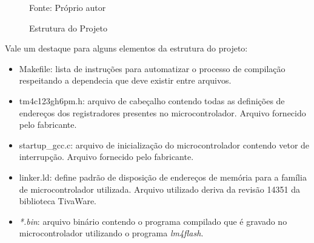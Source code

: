 \begin{figure}[!htb]
\centering
\caption{ Estrutura do Projeto}
\label{fig:estruturaProjeto}

{\small Fonte: Próprio autor}
\end{figure}


Vale um destaque para alguns elementos da estrutura do projeto:


\begin{itemize}
\item Makefile: lista de instruções para automatizar o processo de compilação respeitando a dependecia que deve existir entre arquivos.
\item tm4c123gh6pm.h: arquivo de cabeçalho contendo todas as definições de endereços dos registradores presentes no microcontrolador. Arquivo fornecido pelo fabricante. 
\item startup\_gcc.c: arquivo de inicialização do microcontrolador contendo vetor de interrupção. Arquivo fornecido pelo fabricante.
\item linker.ld: define padrão de disposição de endereços de memória para a família de microcontrolador utilizada. Arquivo utilizado deriva da revisão 14351 da biblioteca TivaWare. 
\item \emph{*.bin}: arquivo binário contendo o programa compilado que é gravado no microcontrolador utilizando o programa \emph{lm4flash}.
\end{itemize}





